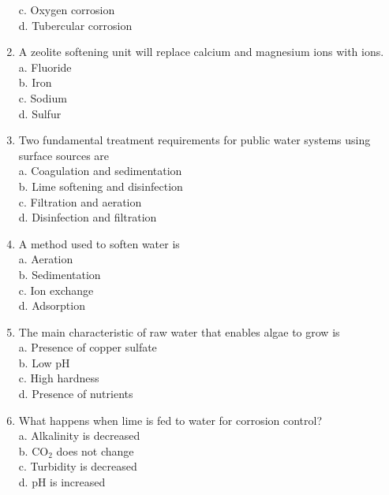 \begin{enumerate}
c. Oxygen corrosion\\

d. Tubercular corrosion\\

  \item A zeolite softening unit will replace calcium and magnesium ions with ions.\\
a. Fluoride\\
b. Iron\\
c. Sodium\\
d. Sulfur\\

\item Two fundamental treatment requirements for public water systems using surface sources are\\

a. Coagulation and sedimentation\\

b. Lime softening and disinfection\\

c. Filtration and aeration\\

d.  Disinfection and filtration\\


\item A method used to soften water is\\
a. Aeration\\
b. Sedimentation\\
c. Ion exchange\\
d. Adsorption\\

\item The main characteristic of raw water that enables algae to grow is\\
a. Presence of copper sulfate\\
b. Low pH\\
c. High hardness\\
d. Presence of nutrients\\

\item What happens when lime is fed to water for corrosion control?\\
a. Alkalinity is decreased\\
b. $\mathrm{CO}_{2}$ does not change\\
c. Turbidity is decreased\\
d. $\mathrm{pH}$ is increased\\


\end{enumerate}
